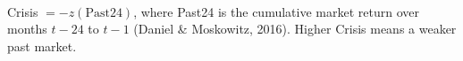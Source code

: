 \begin{table}[htbp]\centering\small
\caption{Mean and standard deviation of monthly returns by Crisis tercile (\%)}
\\[3pt]
\footnotesize\raggedright Crisis $=-z(\mathrm{Past24})$, where Past24 is the cumulative market return over months $t-24$ to $t-1$ (Daniel \& Moskowitz, 2016). Higher Crisis means a weaker past market.
\end{table}
